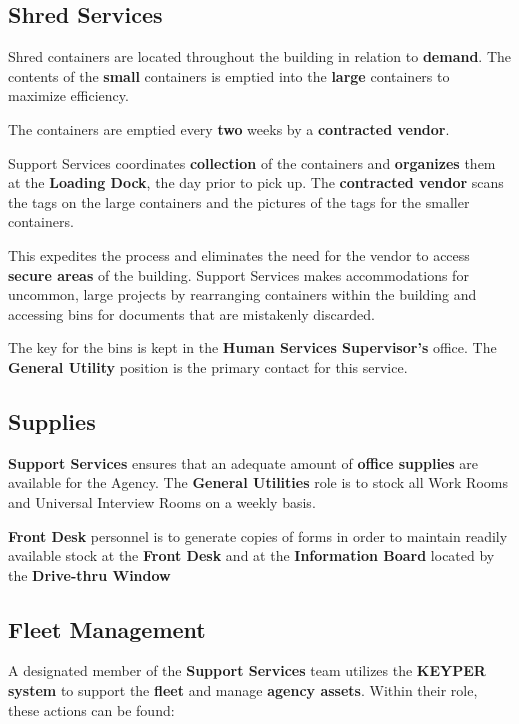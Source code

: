 \documentclass{article}
\begin{document}
\subsection{Shred Services}
Shred containers are located throughout the building in relation to \textbf{demand}. The contents of the \textbf{small} containers is emptied into the \textbf{large} containers to maximize efficiency. 

The containers are emptied every \textbf{two} weeks by a \textbf{contracted vendor}. 

Support Services coordinates \textbf{collection} of the containers and \textbf{organizes} them at the \textbf{Loading Dock}, the day prior to pick up. The \textbf{contracted vendor} scans the tags on the large containers and the pictures of the tags for the smaller containers. 

This expedites the process and eliminates the need for the vendor to access \textbf{secure areas} of the building. Support Services makes accommodations for uncommon, large projects by rearranging containers within the building and accessing bins for documents that are mistakenly discarded. 

The key for the bins is kept in the \textbf{Human Services Supervisor’s} office. The \textbf{General Utility} position is the primary contact for this service.

\subsection{Supplies}
\textbf{Support Services} ensures that an adequate amount of \textbf{office supplies} are available for the Agency. The \textbf{General Utilities} role is to stock all Work Rooms and Universal Interview Rooms on a weekly basis. 

\textbf{Front Desk} personnel is to generate copies of forms in order to maintain readily available stock at the \textbf{Front Desk} and at the \textbf{Information Board} located by the \textbf{Drive-thru Window} 

\subsection{Fleet Management}
A designated member of the \textbf{Support Services} team utilizes the \textbf{KEYPER system} to support the \textbf{fleet} and manage \textbf{agency assets}. Within their role, these actions can be found:
\end{document}
